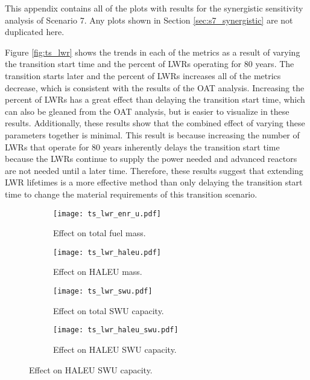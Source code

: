This appendix contains all of the plots with results for the synergistic 
sensitivity analysis of Scenario 7. Any plots shown in Section 
\ref{sec:s7_synergistic} are not duplicated here.

Figure \ref{fig:ts_lwr} shows the trends in each of the metrics as a result
of varying the transition start time and the percent of \glspl{LWR} 
operating for 80 years. The transition starts later and the percent of 
\glspl{LWR} increases all of the metrics decrease, which is consistent 
with the results of the \gls{OAT} analysis. Increasing the percent of 
\glspl{LWR} has a great effect than delaying the transition start time, 
which can also be gleaned from the \gls{OAT} analysis, but is easier 
to visualize in these results. Additionally, these results show that 
the combined effect of varying these parameters together is minimal. 
This result is because increasing the number of \glspl{LWR} that 
operate for 80 years inherently delays the transition start time 
because the \glspl{LWR} continue to supply the power needed and 
advanced reactors are not needed until a later time. Therefore, these 
results suggest that extending \gls{LWR} lifetimes is a more effective 
method than only delaying the transition start time to change the material 
requirements of this transition scenario. 

\begin{figure}
    \begin{subfigure}[t]{0.48\textwidth}
        \centering
        \texttt{[image: ts\_lwr\_enr\_u.pdf]}
        \caption{Effect on total fuel mass.}
        \label{fig:ts_lwr_enr_u}
    \end{subfigure}
    \hfill
    \begin{subfigure}[t]{0.48\textwidth}
        \centering
        \texttt{[image: ts\_lwr\_haleu.pdf]}
        \caption{Effect on HALEU mass.}
        \label{fig:ts_lwr_haleu}
    \end{subfigure}
    
    \begin{subfigure}[t]{0.48\textwidth}
        \centering
        \texttt{[image: ts\_lwr\_swu.pdf]}
        \caption{Effect on total SWU capacity.}
        \label{fig:ts_lwr_swu}
    \end{subfigure}
    \hfill
    \begin{subfigure}[t]{0.48\textwidth}
        \centering
        \texttt{[image: ts\_lwr\_haleu\_swu.pdf]}
        \caption{Effect on HALEU SWU capacity.}
        \label{fig:ts_lwr_haleu_swu}
    \end{subfigure}
\end{figure}

